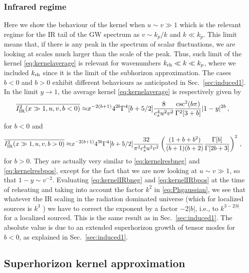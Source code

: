 \documentclass[a4paper,11pt]{article}
\numberwithin{equation}{section}
\begin{document}
\subsubsection{Infrared regime}
Here we show the behaviour of the kernel when $u\sim v\gg 1$ which is the relevant regime for the IR tail of the GW spectrum as $v\sim k_p/k$ and $k\ll k_p$. This limit means that, if there is any peak in the spectrum of scalar fluctuations, we are looking at scales much larger than the scale of the peak. Thus, such limit of the kernel \eqref{eq:kernelaverage} is relevant for wavenumbers $k_{\rm rh}\ll k\ll k_p$, where we included $k_{\rm rh}$ since it is the limit of the subhorizon approximation. The cases $b<0$ and $b>0$ exhibit different behaviours as anticipated in Sec.~\ref{sec:induced1}. In the limit $y\to 1$, the average kernel \eqref{eq:kernelaverage} is respectively given by
\begin{align}\label{eq:kernelIRbneg}
\overline{I_{\rm IR}^2(x\gg1,u,v,b<0)}\approx&x^{-2(b+1)} 4^{2b}\Gamma^4[b+5/2]\frac{8}{c_s^4 u^2v^2}\frac{\csc^2(b\pi)}{\Gamma^2[3+b]}|1-y|^{2b}\,,
\end{align}
for $b<0$ and
\begin{align}\label{eq:kernelIRbpos}
\overline{I_{\rm IR}^2(x\gg1,u,v,b>0)}\approx &x^{-2(b+1)} 4^{3b}\Gamma^4[b+5/2]\frac{32}{\pi^2c_s^4 u^2v^2}
\left(\frac{(1+b+b^2)}{(b+1)(b+2)}\frac{\Gamma[b]}{\Gamma[2b+3]}\right)^2\,,
\end{align}
for $b>0$. They are actually very similar to \eqref{eq:kernelresbneg} and \eqref{eq:kernelresbpos}, except for the fact that we are now looking at $u\sim v\gg 1$, so that $1-y\sim v^{-2}$. Evaluating \eqref{eq:kernelIRbneg} and \eqref{eq:kernelIRbpos} at the time of reheating and taking into account the factor $k^2$ in \eqref{eq:Phgaussian}, we see that whatever the IR scaling in the radiation dominated universe (which for localized sources is $k^3$ \cite{Cai:2019cdl}) we have to correct the exponent by a factor $-2|b|$, i.e., to $k^{3-2|b|}$ for a localized sourced. This is the same result as in Sec.~\ref{sec:induced1}. The absolute value is due to an extended superhorizon growth of tensor modes for $b<0$, as explained in Sec.~\ref{sec:induced1}.

\subsection{Superhorizon kernel approximation \label{sec:superhorizonkernel}}
\end{document}
